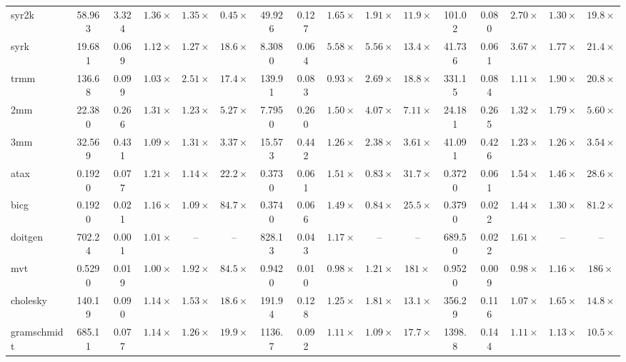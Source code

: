 \documentclass[acmsmall,review,anonymous,screen]{acmart}
\begin{document}
\begin{table}[tbp]
{\begin{tabular}{lccccccccccccccc}
syr2k & 58.963 & 3.324 & \(1.36\times\) & \(1.35\times\) & \(0.45\times\) & 49.926 & 0.127 & \(1.65\times\) & \(1.91\times\) & \(11.9\times\) & 101.02 & 0.080 & \(2.70\times\) & \(1.30\times\) & \(19.8\times\) \\
syrk & 19.681 & 0.069 & \(1.12\times\) & \(1.27\times\) & \(18.6\times\) & 8.3080 & 0.064 & \(5.58\times\) & \(5.56\times\) & \(13.4\times\) & 41.736 & 0.061 & \(3.67\times\) & \(1.77\times\) & \(21.4\times\) \\
trmm & 136.68 & 0.099 & \(1.03\times\) & \(2.51\times\) & \(17.4\times\) & 139.91 & 0.083 & \(0.93\times\) & \(2.69\times\) & \(18.8\times\) & 331.15 & 0.084 & \(1.11\times\) & \(1.90\times\) & \(20.8\times\) \\
2mm & 22.380 & 0.266 & \(1.31\times\) & \(1.23\times\) & \(5.27\times\) & 7.7950 & 0.260 & \(1.50\times\) & \(4.07\times\) & \(7.11\times\) & 24.181 & 0.265 & \(1.32\times\) & \(1.79\times\) & \(5.60\times\) \\
3mm & 32.569 & 0.431 & \(1.09\times\) & \(1.31\times\) & \(3.37\times\) & 15.573 & 0.442 & \(1.26\times\) & \(2.38\times\) & \(3.61\times\) & 41.091 & 0.426 & \(1.23\times\) & \(1.26\times\) & \(3.54\times\) \\
atax & 0.1920 & 0.077 & \(1.21\times\) & \(1.14\times\) & \(22.2\times\) & 0.3730 & 0.061 & \(1.51\times\) & \(0.83\times\) & \(31.7\times\) & 0.3720 & 0.061 & \(1.54\times\) & \(1.46\times\) & \(28.6\times\) \\
bicg & 0.1920 & 0.021 & \(1.16\times\) & \(1.09\times\) & \(84.7\times\) & 0.3740 & 0.066 & \(1.49\times\) & \(0.84\times\) & \(25.5\times\) & 0.3790 & 0.022 & \(1.44\times\) & \(1.30\times\) & \(81.2\times\) \\
doitgen & 702.24 & 0.001 & \(1.01\times\) & -- & -- & 828.13 & 0.043 & \(1.17\times\) & -- & -- & 689.50 & 0.022 & \(1.61\times\) & -- & -- \\
mvt & 0.5290 & 0.019 & \(1.00\times\) & \(1.92\times\) & \(84.5\times\) & 0.9420 & 0.010 & \(0.98\times\) & \(1.21\times\) & \(181\times\) & 0.9520 & 0.009 & \(0.98\times\) & \(1.16\times\) & \(186\times\) \\
cholesky & 140.19 & 0.090 & \(1.14\times\) & \(1.53\times\) & \(18.6\times\) & 191.94 & 0.128 & \(1.25\times\) & \(1.81\times\) & \(13.1\times\) & 356.29 & 0.116 & \(1.07\times\) & \(1.65\times\) & \(14.8\times\) \\
gramschmidt & 685.11 & 0.077 & \(1.14\times\) & \(1.26\times\) & \(19.9\times\) & 1136.7 & 0.092 & \(1.11\times\) & \(1.09\times\) & \(17.7\times\) & 1398.8 & 0.144 & \(1.11\times\) & \(1.13\times\) & \(10.5\times\) \\

\end{tabular}}
\end{table}
\end{document}
